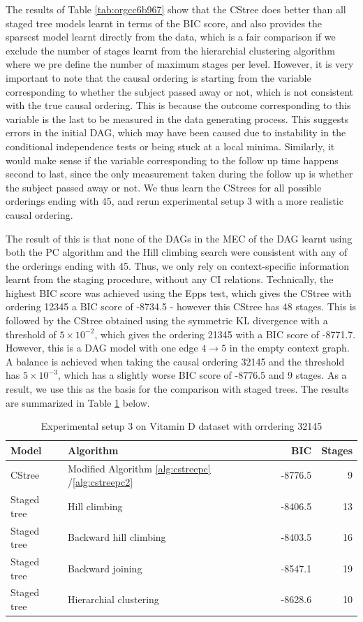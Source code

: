 \documentclass{tufte-book}
\begin{document}
The results of Table \ref{tab:orgcc6b967} show that the CStree does better than all staged tree models learnt in terms of the BIC score, and also provides the sparsest model learnt directly from the data, which is a fair comparison if we exclude the number of stages learnt from the hierarchial clustering algorithm where we pre define the number of maximum stages per level. However, it is very important to note that the causal ordering is starting from the variable corresponding to whether the subject passed away or not, which is not consistent with the true causal ordering. This is because the outcome corresponding to this variable is the last to be measured in the data generating process. This suggests errors in the initial DAG, which may have been caused due to instability in the conditional independence tests or being stuck at a local minima. Similarly, it would make sense if the variable corresponding to the follow up time happens second to last, since the only measurement taken during the follow up is whether the subject passed away or not. We thus learn the CStrees for all possible orderings ending with 45, and rerun experimental setup 3 with a more realistic causal ordering.

The result of this is that none of the DAGs in the MEC of the DAG learnt using both the PC algorithm and the Hill climbing search were consistent with any of the orderings ending with 45. Thus, we only rely on context-specific information learnt from the staging procedure, without any CI relations. Technically, the highest BIC score was achieved using the Epps test, which gives the CStree with ordering 12345 a BIC score of -8734.5 - however this CStree has 48 stages. This is followed by the CStree obtained using the symmetric KL divergence with a threshold of \(5 \times 10^{-2}\), which gives the ordering 21345 with a BIC score of -8771.7. However, this is a DAG model with one edge \(4 \rightarrow 5\) in the empty context graph. A balance is achieved when taking the causal ordering 32145 and the threshold has \(5 \times 10^{-3}\), which has a slightly worse BIC score of -8776.5 and 9 stages. As a result, we use this as the basis for the comparison with staged trees. The results are summarized in Table \ref{tab:org298bfc6} below.


\begin{table}[htbp]
\caption{\label{tab:org298bfc6}Experimental setup 3 on Vitamin D dataset with orrdering 32145}
\centering
\begin{tabular}{l|l|r|r}
\hline
Model & Algorithm & BIC & Stages\\
\hline
CStree & Modified Algorithm \ref{alg:cstreepc} /\ref{alg:cstreepc2} & -8776.5 & 9\\
Staged tree & Hill climbing & -8406.5 & 13\\
Staged tree & Backward hill climbing & -8403.5 & 16\\
Staged tree & Backward joining & -8547.1 & 19\\
Staged tree & Hierarchial clustering & -8628.6 & 10\\
\end{tabular}
\end{table}
\end{document}
